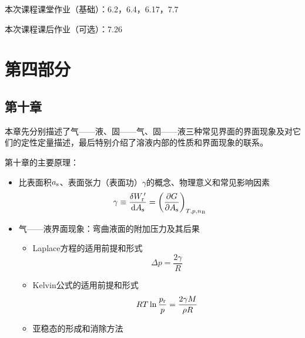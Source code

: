 \documentclass[9pt]{beamer}
\newcommand\B{{\rm B}}
\newcommand*{\dif}{\mathop{}\!\mathrm{d}}
\newcommand\rr{{\rm r}}
\newcommand{\s}{{\rm s}}
\begin{document}
	\begin{frame}
	
	本次课程课堂作业（基础）：6.2，6.4，6.17，7.7
	
	\hspace*{\fill}	
	
	本次课程课后作业（可选）：7.26
	
	\end{frame}		
	
	\section{第四部分}	
	
	\subsection{第十章}
	\begin{frame}
	
	{\color{blue}本章先分别描述了气——液、固——气、固——液三种常见界面的界面现象及对它们的定性定量描述，最后特别介绍了溶液内部的性质和界面现象的联系。}
	
	第十章的主要原理：
	
	\begin{itemize}
	
	\item 比表面积$a_\s$、表面张力（表面功）$\gamma$的概念、物理意义和常见影响因素
	\[
		\gamma \equiv \frac{ \delta W^{\,\prime}_\rr }{ \dif A_\s } = \left( \frac{ \partial G }{ \partial A_\s } \right)_{T,p,n_\B}
	\]
	
	\item 气——液界面现象：弯曲液面的附加压力及其后果
		\begin{itemize}
	
		\item Laplace方程的适用前提和形式
		\[
			\Delta p = \frac{ 2\gamma }{ R }
		\]
		
		\item Kelvin公式的适用前提和形式
		\[
			RT \ln{ \frac{ p_\rr }{ p } } = \frac{ 2 \gamma M }{ \rho R }
		\]
		
		\item 亚稳态的形成和消除方法
	
		\end{itemize}
	
	\end{itemize}
	
	\end{frame}
	
\end{document}
